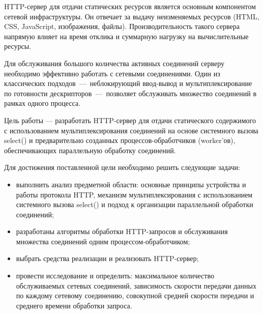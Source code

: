 
HTTP-сервер для отдачи статических ресурсов является основным компонентом сетевой инфраструктуры. Он отвечает за выдачу неизменяемых ресурсов (HTML, CSS, JavaScript, изображения, файлы). Производительность такого сервера напрямую влияет на время отклика и суммарную нагрузку на вычислительные ресурсы.

Для обслуживания большого количества активных соединений серверу необходимо эффективно работать с сетевыми соединениями. Один из классических подходов~---~неблокирующий ввод-вывод и мультиплексирование по готовности дескрипторов~---~позволяет обслуживать множество соединений в рамках одного процесса.

Цель работы — разработать HTTP-сервер для отдачи статического содержимого с использованием мультиплексирования соединений на основе системного вызова select() и предварительно созданных процессов-обработчиков (worker’ов), обеспечивающих параллельную обработку соединений.

Для достижения поставленной цели необходимо решить следующие задачи:
\begin{itemize}
\item выполнить анализ предметной области: основные принципы устройства и работы протокола HTTP, механизм мультиплексирования с использованием системного вызова select() и подход к организации параллельной обработки соединений;
\item разработаны алгоритмы обработки HTTP-запросов и обслуживания множества соединений одним процессом-обработчиком;
\item выбрать средства реализации и реализовать HTTP-сервер;
\item провести исследование и определить: максимальное количество обслуживаемых сетевых соединений, зависимость скорости передачи данных по каждому сетевому соединению, совокупной средней скорости передачи и среднего времени обработки запроса.
\end{itemize}